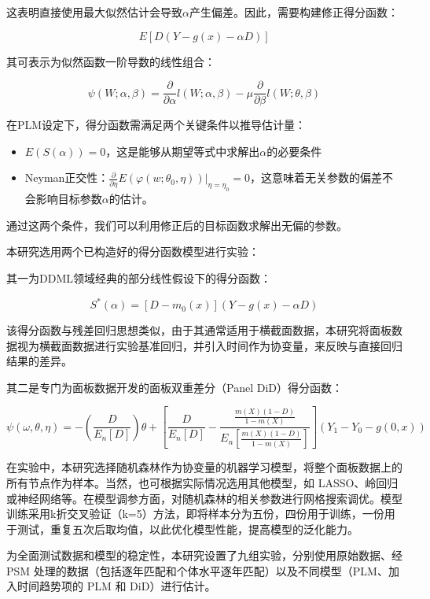 \documentclass[a4paper,12pt]{article}
\begin{document}
这表明直接使用最大似然估计会导致$\alpha$产生偏差。因此，需要构建修正得分函数：

\[
E[D(Y - g(x) - \alpha D)]
\]

其可表示为似然函数一阶导数的线性组合：

\[
\psi(W; \alpha, \beta) = \frac{\partial}{\partial \alpha} l(W; \alpha, \beta) - \mu \frac{\partial}{\partial \beta} l(W; \theta, \beta)
\]

在PLM设定下，得分函数需满足两个关键条件以推导估计量：

\begin{itemize}
    \item $E\left(S\left(\alpha\right)\right)=0$，这是能够从期望等式中求解出$\alpha$的必要条件
    \item Neyman正交性：$\frac{\partial}{\partial\eta}E\left(\varphi\left(w;\theta_0,\eta\right)\right)|_{\eta=\eta_0}=0$，这意味着无关参数的偏差不会影响目标参数$\alpha$的估计。
\end{itemize}

通过这两个条件，我们可以利用修正后的目标函数求解出无偏的参数。

本研究选用两个已构造好的得分函数模型进行实验：

其一为DDML领域经典的部分线性假设下的得分函数：

$$
S^\ast\left(\alpha\right)=\left[D-m_0\left(x\right)\right]\left(Y-g\left(x\right)-\alpha D\right)
$$

该得分函数与残差回归思想类似，由于其通常适用于横截面数据，本研究将面板数据视为横截面数据进行实验基准回归，并引入时间作为协变量，来反映与直接回归结果的差异。

其二是专门为面板数据开发的面板双重差分（Panel DiD）得分函数：

\begin{equation*}
\psi(\omega, \theta, \eta) = -\left(\frac{D}{E_n[D]}\right) \theta + \left[\frac{D}{E_n[D]} - \frac{\frac{m(X)(1-D)}{1-m(X)}}{E_n\left[\frac{m(X)(1-D)}{1-m(X)}\right]}\right](Y_1 - Y_0 - g(0,x))
\end{equation*}

在实验中，本研究选择随机森林作为协变量的机器学习模型，将整个面板数据上的所有节点作为样本。当然，也可根据实际情况选用其他模型，如 LASSO、岭回归或神经网络等。在模型调参方面，对随机森林的相关参数进行网格搜索调优。模型训练采用k折交叉验证（k=5）方法，即将样本分为五份，四份用于训练，一份用于测试，重复五次后取均值，以此优化模型性能，提高模型的泛化能力。

为全面测试数据和模型的稳定性，本研究设置了九组实验，分别使用原始数据、经 PSM 处理的数据（包括逐年匹配和个体水平逐年匹配）以及不同模型（PLM、加入时间趋势项的 PLM 和 DiD）进行估计。
\end{document}
